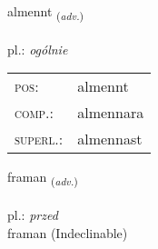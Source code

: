 \documentclass[frontgrid, backgrid]{flacards}\usepackage[]{graphicx}\usepackage[]{xcolor}
\begin{document}
\renewcommand{\flhead}{\vskip5pt \fboxsep=0pt {\small\bfseries\footnotesize Atviksorð | przysłówek}}
\renewcommand{\fcfoot}{\vskip5pt \fboxsep=0pt \hspace{2pt}{\small\bfseries\footnotesize 1K}}

\renewcommand{\blhead}{\vskip5pt {\small\bfseries\footnotesize Atviksorð | przysłówek }}
\renewcommand{\bcfoot}{\vskip5pt \hspace{2pt}{\small\bfseries\footnotesize 1K}}


{almennt \small{\textsubscript{(\textit{adv.})}} \\[1ex] %
\textphonetic{[almɛn̥t]} \\
pl.: \emph{ogólnie} \\  [2ex]
\renewcommand*{\arraystretch}{0.8}
\begin{tabular}{ll}
\textsc{pos}: & almennt \\ 
\textsc{comp.}: & almennara \\ 
\textsc{superl.}: & almennast \\
\end{tabular}
}


\renewcommand{\flhead}{\vskip5pt \fboxsep=0pt {\small\bfseries\footnotesize Atviksorð | przysłówek}}
\renewcommand{\fcfoot}{\vskip5pt \fboxsep=0pt \hspace{2pt}{\small\bfseries\footnotesize 1K}}

\renewcommand{\blhead}{\vskip5pt {\small\bfseries\footnotesize Atviksorð | przysłówek }}
\renewcommand{\bcfoot}{\vskip5pt \hspace{2pt}{\small\bfseries\footnotesize 1K}}


{framan \small{\textsubscript{(\textit{adv.})}} \\[1ex]
\textphonetic{[fraːman]} \\
pl.: \emph{przed} \\  [2ex]
framan (Indeclinable)}

\renewcommand{\flhead}{\vskip5pt \fboxsep=0pt {\small\bfseries\footnotesize Nafnorð | rzeczownik}}
\renewcommand{\fcfoot}{\vskip5pt \fboxsep=0pt \hspace{2pt}{\small\bfseries\footnotesize 1K}}
\end{document}
